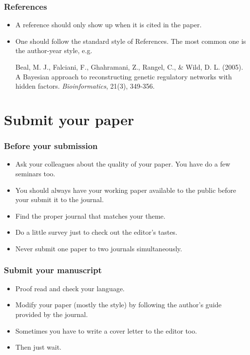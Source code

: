 \documentclass[10pt]{beamer}
\begin{document}
\begin{frame}
  \frametitle{References}

  \begin{itemize}
  \item A reference should only show up when it is cited in the paper.
  \item One should follow the standard style of References. The most common one
    is the author-year style, e.g.



    Beal, M. J., Falciani, F., Ghahramani, Z., Rangel, C., \& Wild,
    D. L. (2005). A Bayesian approach to reconstructing genetic regulatory
    networks with hidden factors. \emph{Bioinformatics}, 21(3), 349-356.


  \end{itemize}

\end{frame}


\section{Submit your paper}
\begin{frame}
  \frametitle{Before your submission}

  \begin{itemize}
  \item Ask your colleagues about the quality of your paper. You have do a few
    seminars too.
  \item You should always have your working paper available to the public
    before your submit it to the journal.
  \item Find the proper journal that matches your theme.
  \item Do a little survey just to check out the editor's tastes.
  \item Never submit one paper to two journals simultaneously.


  \end{itemize}
\end{frame}


\begin{frame}
  \frametitle{Submit your manuscript}

  \begin{itemize}

  \item Proof read and check your language.

  \item Modify your paper (mostly the style) by following the author's guide
    provided by the journal.

  \item Sometimes you have to write a cover letter to the editor too.
  \item Then just wait.
  \end{itemize}

\end{frame}
\end{document}
